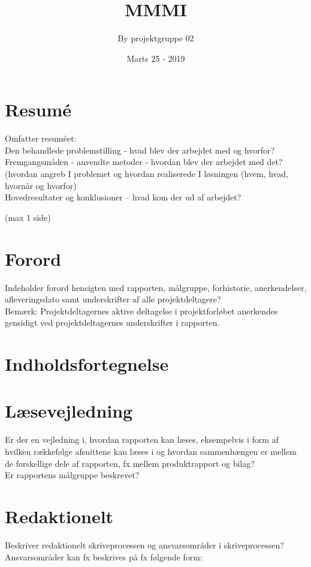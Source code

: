 \documentclass[12pt]{article}
\title{MMMI}
\author{By projektgruppe 02 }
\date{Marts 25 - 2019}
\begin{document}
\begin{titlepage}
\clearpage
\maketitle
\thispagestyle{empty}
\end{titlepage}


\section{Resumé}
Omfatter resuméet:\\
Den behandlede problemstilling - hvad blev der arbejdet med og hvorfor?\\
Fremgangsmåden - anvendte metoder - hvordan blev der arbejdet med det? \\
(hvordan angreb I problemet og hvordan realiserede I løsningen (hvem, hvad, hvornår og hvorfor)\\
Hovedresultater og konklusioner  – hvad kom der ud af arbejdet?\\
\begin{Large}
(max  1 side)
\end{Large}
\section{Forord}
Indeholder forord hensigten med rapporten, målgruppe, forhistorie, anerkendelser, afleveringsdato samt underskrifter af alle projektdeltagere?\\
Bemærk: Projektdeltagernes aktive deltagelse i projektforløbet anerkendes gensidigt ved projektdeltagernes underskrifter i rapporten. 
\section{Indholdsfortegnelse}
\tableofcontents
\pagebreak
\section{Læsevejledning}
Er der en vejledning i, hvordan rapporten kan læses, eksempelvis i form af hvilken rækkefølge afsnittene kan læses i og hvordan sammenhængen er mellem de forskellige dele af rapporten, fx mellem produktrapport og bilag?\\
Er rapportens målgruppe beskrevet?
\section{Redaktionelt}
Beskriver redaktionelt skriveprocessen og ansvarsområder i skriveprocessen?\\
Ansvarsområder kan fx beskrives på fx følgende form:
\end{document}
